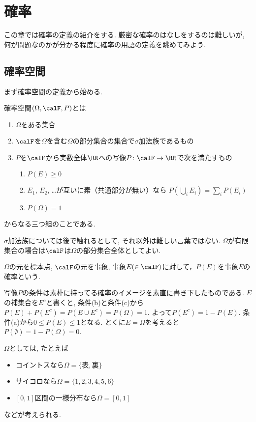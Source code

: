 \setcounter{chapter}{0}
\chapter{確率}
この章では確率の定義の紹介をする.
厳密な確率のはなしをするのは難しいが, 何が問題なのかが分かる程度に確率の用語の定義を眺めてみよう.

\section{確率空間}
まず確率空間の定義から始める.
\begin{definition}
確率空間$(\Omega, \calF, P)$とは
\begin{enumerate}
\item $\Omega$をある集合
\item $\calF$を$\Omega$を含む$\Omega$の部分集合の集合で$\sigma $加法族であるもの
\item $P$を$\calF$から実数全体$\RR$への写像$P\colon \calF \to  \RR$で次を満たすもの
\begin{enumerate}
\item $P(E) \ge 0$
\item $E_1$, $E_2$, \ldots が互いに素（共通部分が無い）なら $P(\bigcup_i E_i) = \sum_i P(E_i)$
\item $P(\Omega) = 1$
\end{enumerate}
\end{enumerate}
からなる三つ組のことである.
\end{definition}
$\sigma $加法族については後で触れるとして, それ以外は難しい言葉ではない.
$\Omega$が有限集合の場合は$\calF$は$\Omega$の部分集合全体としてよい.

$\Omega$の元を標本点, $\calF$の元を事象, 事象$E(\in  \calF)$に対して，$P(E)$を事象$E$の確率という.

写像$P$の条件は素朴に持ってる確率のイメージを素直に書き下したものである.
$E$の補集合を$E^c$と書くと, 条件(b)と条件(c)から$P(E) + P(E^c)=P(E\cup E^c)=P(\Omega)=1$.
よって$P(E^c)=1-P(E)$. 条件(a)から$0 \le P(E) \le 1$となる.
とくに$E=\Omega$を考えると$P(\emptyset)=1-P(\Omega)=0$.

$\Omega$としては, たとえば
\begin{itemize}
\item コイントスなら$\Omega = \{表, 裏\}$
\item サイコロなら$\Omega = \{1, 2, 3, 4, 5, 6\}$
\item $[0, 1]$区間の一様分布なら$\Omega = [0, 1]$
\end{itemize}
などが考えられる.
\pagebreak

